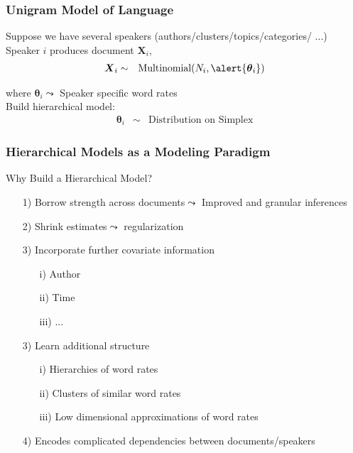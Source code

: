 \documentclass{beamer}
\numberwithin{equation}{section}
\begin{document}
\begin{frame}
\frametitle{Unigram Model of Language}

\Large 

Suppose we have several speakers (authors/clusters/topics/categories/ ...)\\

Speaker $i$ produces document $\boldsymbol{X}_{i}$, 
\begin{eqnarray}
\boldsymbol{X}_{i} & \sim & \text{Multinomial}(N_{i}, \alert{\boldsymbol{\theta}_{i}} ) \nonumber 
\end{eqnarray}

where $\boldsymbol{\theta}_{i} \leadsto$ Speaker specific word rates\\

Build hierarchical model: 
\begin{eqnarray}
\boldsymbol{\theta}_{i} & \sim & \text{Distribution on Simplex} \nonumber 
\end{eqnarray}




\end{frame}


\begin{frame}
\frametitle{Hierarchical Models as a Modeling Paradigm}


Why Build a Hierarchical Model?

\begin{itemize}
\item[1)] Borrow strength across documents$\leadsto$ Improved and granular inferences
\item[2)] Shrink estimates$\leadsto$ regularization
\item[3)] Incorporate further covariate information
\begin{itemize}
\item[i)] Author
\item[ii)] Time
\item[iii)] ...
\end{itemize}
\item[3)] Learn additional structure 
\begin{itemize}
\item[i)] Hierarchies of word rates
\item[ii)] Clusters of similar word rates
\item[iii)] Low dimensional approximations of word rates
\end{itemize}
\item[4)] Encodes complicated dependencies between documents/speakers

\end{itemize}



\end{frame}
\end{document}
